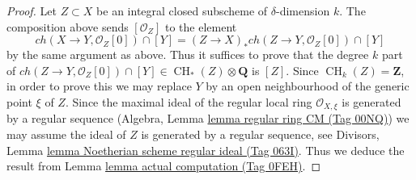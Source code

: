 \documentclass{amsart}
\theoremstyle{plain}
\theoremstyle{definition}
\theoremstyle{remark}
\numberwithin{equation}{subsection}
\def\CH{\mathop{\mathrm{CH}}\nolimits}
\begin{document}
\begin{proof}
\medskip\noindent
Let $Z \subset X$ be an integral closed subscheme of $\delta$-dimension $k$.
The composition above sends $[\mathcal{O}_Z]$ to the element
$$
ch(X \to Y, \mathcal{O}_Z[0]) \cap [Y] =
(Z \to X)_* ch(Z \to Y, \mathcal{O}_Z[0]) \cap [Y]
$$
by the same argument as above.
Thus it suffices to prove that the degree $k$ part of
$ch(Z \to Y, \mathcal{O}_Z[0]) \cap [Y] \in
\CH_*(Z) \otimes \mathbf{Q}$ is $[Z]$.
Since $\CH_k(Z) = \mathbf{Z}$, in order
to prove this we may replace $Y$ by an open neighbourhood of the
generic point $\xi$ of $Z$. Since the maximal ideal of the regular
local ring $\mathcal{O}_{X, \xi}$ is generated by a
regular sequence (Algebra, Lemma \href{https://stacks.math.columbia.edu/tag/00NQ}{lemma regular ring CM (Tag 00NQ)})
we may assume the ideal of $Z$ is generated by a regular sequence, see
Divisors, Lemma \href{https://stacks.math.columbia.edu/tag/063I}{lemma Noetherian scheme regular ideal (Tag 063I)}.
Thus we deduce the result from Lemma \href{https://stacks.math.columbia.edu/tag/0FEH}{lemma actual computation (Tag 0FEH)}.
\end{proof}
\end{document}
